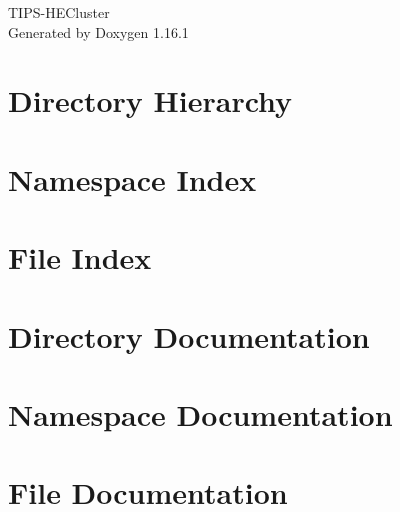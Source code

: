 \documentclass[twoside]{book}
\newcommand{\+}{\discretionary{\mbox{\scriptsize$\hookleftarrow$}}{}{}}
\newcommand{\clearemptydoublepage}{%
    \newpage{\pagestyle{empty}\cleardoublepage}%
  }
\begin{document}
  \raggedbottom
    \hypersetup{pageanchor=false,
                bookmarksnumbered=true,
                pdfencoding=unicode
               }
  \begin{titlepage}
  \vspace*{7cm}
  \begin{center}%
  {\Large TIPS-\/\+HECluster}\\
  \vspace*{1cm}
  {\large Generated by Doxygen 1.16.1}\\
  \end{center}
  \end{titlepage}
  \clearemptydoublepage
  \tableofcontents
  \clearemptydoublepage
  \hypersetup{pageanchor=true}

\chapter{Directory Hierarchy}

\chapter{Namespace Index}

\chapter{File Index}

\chapter{Directory Documentation}

\chapter{Namespace Documentation}



\chapter{File Documentation}



















  \backmatter
  \newpage
  \clearemptydoublepage
  \printindex
\end{document}
